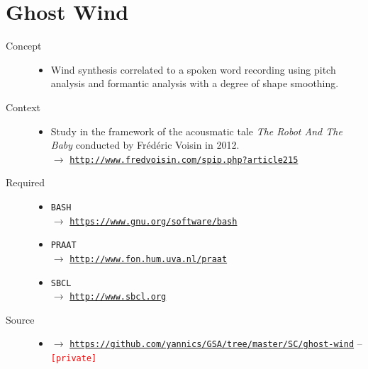 

\section*{Ghost Wind}

\thispagestyle{empty}

\bigskip

\begin{description}
\item[Concept] \hfill 
\begin{itemize}
\item[] Wind synthesis correlated to a spoken word recording using pitch analysis and formantic analysis with a degree of shape smoothing.
\end{itemize}
\bigskip
\item[Context] \hfill 
\begin{itemize}
\item[] Study in the framework of the acousmatic tale \textit{The Robot And The Baby} conducted by Fr\'{e}d\'{e}ric Voisin in 2012. \\
$\rightarrow$ \href{http://www.fredvoisin.com/spip.php?article215}{\texttt{\small http://www.fredvoisin.com/spip.php?article215}}
\end{itemize}
\bigskip
\item[Required] \hfill 
\begin{itemize}
\setlength\itemsep{1em}
\item[] \texttt{BASH} \\ $\rightarrow$ \href{https://www.gnu.org/software/bash}{\texttt{\small https://www.gnu.org/software/bash}}
\item[] \texttt{PRAAT} \\ $\rightarrow$ \href{http://www.fon.hum.uva.nl/praat}{\texttt{\small http://www.fon.hum.uva.nl/praat}} 
\item[] \texttt{SBCL} \\ $\rightarrow$ \href{http://www.sbcl.org}{\texttt{\small http://www.sbcl.org}}
\end{itemize}
\bigskip
\item[Source] \hfill 
\begin{itemize}
\item[] $\rightarrow$ \href{https://github.com/yannics/GSA/tree/master/SC/ghost-wind}{\texttt{\small https://github.com/yannics/GSA/tree/master/SC/ghost-wind}} -- \texttt{\textcolor{red}{\small[private]}}

\end{itemize}
\end{description}
